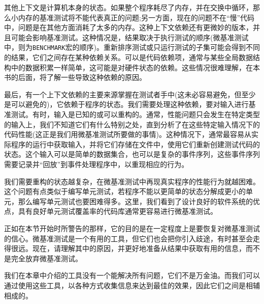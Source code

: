 其他上下文是计算机本身的状态。如果整个程序耗尽了内存，并在交换中循环，那么小内存的基准测试将不能代表真正的问题;另一方面，现在的问题不在“慢”代码中，问题是在其他方面消耗了太多的内存。这种上下文依赖还有更微妙的版本，并且可能会影响基准测试。这种情况是，结果取决于执行测试的顺序(微基准测试中，则为\texttt{BENCHMARK}宏的顺序)。重新排序测试或只运行测试的子集可能会得到不同的结果，它们之间存在某种依赖关系。可以是代码依赖项，通常与某些全局数据结构中的数据积累一样简单，这可能是对硬件状态的依赖。这些情况很难理解，在本书的后面，将了解一些导致这种依赖的原因。

最后，有一个上下文依赖的主要来源掌握在测试者手中(这未必容易避免，但至少是可以避免的)，它依赖于程序的状态。我们需要处理这种依赖，要对输入进行基准测试。有时，输入是已知的或可以重构的。通常，性能问题只会发生在特定类型的输入上，我们不知道它们有什么特别之处，直到分析了在这些特定输入情况下的代码性能(这正是我们用微基准测试所要做的事情)。这种情况下，通常最容易从实际程序的运行中获取输入，并将它们存储在文件中，使用它们重新创建测试代码的状态。这个输入可以是简单的数据集合，也可以是复杂的事件序列，这些事件序列需要记录并“回放”到事件处理程序中，以重现相应的行为。

我们需要重构的状态越复杂，在微基准测试中再现真实程序的性能行为就越困难。这个问题有点类似于编写单元测试，若程序不能以更简单的状态分解成更小的单元，那么编写单元测试也要困难得多。这里，我们看到了设计良好的软件系统的优点，具有良好单元测试覆盖率的代码库通常更容易进行微基准测试。

正如在本节开始时所警告的那样，它的目的是在一定程度上是要恢复对微基准测试的信心。微基准测试是一个有用的工具，但它们也会把你引入歧途，有时甚至会走得很远。现在，请理解其中的原因，并更好地准备从结果中获取有用的信息，而不是完全放弃微基准测试。

我们在本章中介绍的工具没有一个能解决所有问题，它们不是万金油。而我们可以通过使用这些工具，以各种方式收集信息来达到最佳的效果，因此它们之间是相辅相成的。






